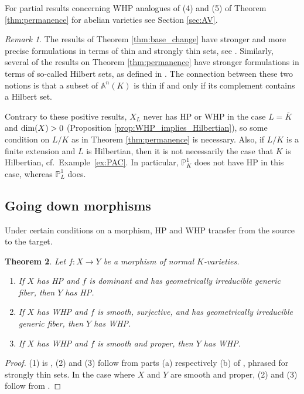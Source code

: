 \documentclass[10pt,a4paper]{amsart}
\theoremstyle{plain}
\newtheorem{theorem}{Theorem}
\theoremstyle{remark}
\newtheorem{remark}[theorem]{Remark}
\numberwithin{theorem}{section}
\begin{document}
For partial results concerning WHP analogues of (4) and (5) of Theorem \ref{thm:permanence}
for abelian varieties 
see Section \ref{sec:AV}.

\begin{remark}\label{remark:preservation}
The results of Theorem \ref{thm:base_change} have stronger and more precise formulations in terms of thin and strongly thin sets, see \cite{BFP24}.
Similarly, several of the results on Theorem \ref{thm:permanence} have stronger formulations in terms of
so-called Hilbert sets, as defined in \cite[Section 12.1]{FJ}.
The connection between these two notions is that a subset of $\mathbb{A}^n(K)$ is thin if and only if its complement contains a Hilbert set.
\end{remark}

Contrary to these positive results,
 $X_L$ never has HP or WHP in the case $L=\overline{K}$ and ${\rm dim}(X)>0$ (Proposition \ref{prop:WHP_implies_Hilbertian}),
so some condition on $L/K$ as in Theorem \ref{thm:permanence} is necessary.
Also, if $L/K$ is a finite extension and $L$ is Hilbertian, then it is not necessarily the case that $K$ is Hilbertian,
cf.~Example~\ref{ex:PAC}.
In particular, $\mathbb{P}^1_K$ does not have HP in this case, whereas $\mathbb{P}^1_L$ does.


\subsection{Going down morphisms}

Under certain conditions on a morphism, 
HP and WHP transfer from the source to the target.

\begin{theorem}\label{thm:down} 
Let $f\colon X\rightarrow Y$ be a morphism of normal $K$-varieties.
\begin{enumerate}
\item If $X$ has HP
and $f$ is dominant
and has geometrically irreducible generic fiber,
then  $Y$ has HP.
\item  If $X$ has WHP and
$f$ is smooth, surjective, and has geometrically irreducible generic fiber,
then  $Y$ has WHP.  
\item If $X$ has WHP 
and $f$ is smooth and proper,
then $Y$ has WHP.
\end{enumerate}
\end{theorem}

\begin{proof}
(1) is \cite[Proposition 7.13]{CTS}, 
(2) and (3) follow from parts (a) respectively (b) of \cite[Lemma 5.3]
{BFP24}, phrased for strongly thin sets.
In the case where $X$ and $Y$ are smooth and proper, (2) and (3) follow from \cite[Theorem 3.7]{CDJLZ}.
\end{proof}
\end{document}
